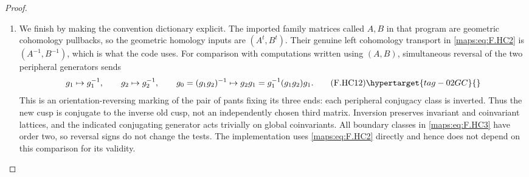\begin{proof}
\begin{enumerate}[label={$\langle1\rangle$\arabic*.}]
\item We finish by making the convention dictionary explicit.
The imported family matrices called $A,B$ in that
program are geometric cohomology pullbacks, so the
geometric homology inputs are $(A^t,B^t)$.
Their genuine left cohomology transport in \eqref{maps:eq:F.HC2}
is $(A^{-1},B^{-1})$, which is what the code uses.
For comparison with computations written using
$(A,B)$, simultaneous reversal of the two peripheral
generators sends
\[
 g_1\mapsto g_1^{-1},\qquad
 g_2\mapsto g_2^{-1},\qquad
 g_0=(g_1g_2)^{-1}\mapsto
     g_2g_1=g_1^{-1}(g_1g_2)g_1 .
 \tag{F.HC12}\hypertarget{tag-02GC}{}\label{maps:eq:F.HC12}
\]
This is an orientation-reversing marking of the
pair of pants fixing its three ends: each peripheral
conjugacy class is inverted.
Thus the new cusp is conjugate to the inverse old
cusp, not an independently chosen third matrix.
Inversion preserves invariant and coinvariant
lattices, and the indicated conjugating generator
acts trivially on global coinvariants.
All boundary classes in \eqref{maps:eq:F.HC3} have order two, so
reversal signs do not change the tests.
The implementation uses \eqref{maps:eq:F.HC2} directly and hence
does not depend on this comparison for its validity.

\end{enumerate}
\end{proof}




